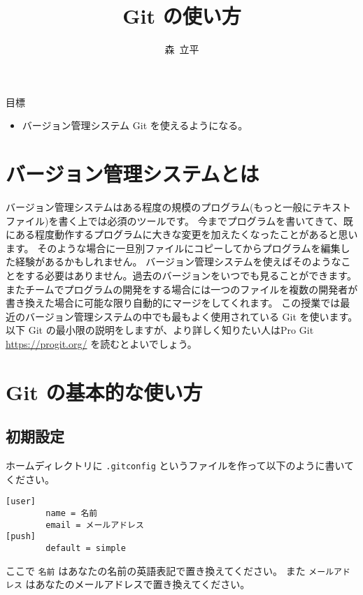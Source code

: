 \documentclass[a4paper,11pt, article]{memoir}
\title{Git の使い方}
\author{森~立平}
\date{}
\begin{document}
\maketitle

\noindent
目標
\begin{itemize}
\item バージョン管理システム Git を使えるようになる。
\end{itemize}


\section{バージョン管理システムとは}
バージョン管理システムはある程度の規模のプログラム(もっと一般にテキストファイル)を書く上では必須のツールです。
今までプログラムを書いてきて、既にある程度動作するプログラムに大きな変更を加えたくなったことがあると思います。
そのような場合に一旦別ファイルにコピーしてからプログラムを編集した経験があるかもしれません。
バージョン管理システムを使えばそのようなことをする必要はありません。過去のバージョンをいつでも見ることができます。
またチームでプログラムの開発をする場合には一つのファイルを複数の開発者が書き換えた場合に可能な限り自動的にマージをしてくれます。
この授業では最近のバージョン管理システムの中でも最もよく使用されている Git を使います。
以下 Git の最小限の説明をしますが、より詳しく知りたい人はPro Git \url{https://progit.org/} を読むとよいでしょう。

\section{Git の基本的な使い方}
\subsection{初期設定}
ホームディレクトリに \texttt{.gitconfig} というファイルを作って以下のように書いてください。
\begin{verbatim}
[user]
        name = 名前
        email = メールアドレス
[push]
        default = simple
\end{verbatim}
ここで \texttt{名前} はあなたの名前の英語表記で置き換えてください。
また \texttt{メールアドレス} はあなたのメールアドレスで置き換えてください。
\end{document}
